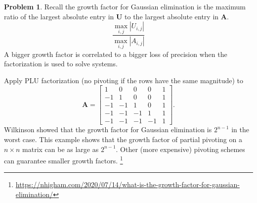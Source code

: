 \documentclass[12pt]{article}
\theoremstyle{definition}
\newtheorem{problem}{Problem}
\renewcommand{\vec}{\mathbf}
\begin{document}
\begin{problem}
    Recall the growth factor for Gaussian elimination is the maximum ratio of the largest absolute entry in $\vec{U}$ to the largest absolute entry in $\vec{A}$.
    \[
        \frac{\max_{i,j} |U_{i,j}|}{\max_{i,j} |A_{i,j}|}
    \]
    A bigger growth factor is correlated to a bigger loss of precision when the factorization is used to solve systems.

    Apply PLU factorization (no pivoting if the rows have the same magnitude) to
    \[
    \vec{A} = 
    \begin{bmatrix}
    	1 & 0 & 0 & 0 & 1 \\
    	-1 & 1 & 0 & 0 & 1 \\
    	-1 & -1 & 1 & 0 & 1 \\
    	-1 & -1 & -1 & 1 & 1 \\
    	-1 & -1 & -1 & -1 & 1
    \end{bmatrix}.
    \]
    Wilkinson showed that the growth factor for Gaussian elimination is $2^{n-1}$ in the worst case.
    This example shows that the growth factor of partial pivoting on a $n\times n$ matrix can be as large as $2^{n-1}$. 
    Other (more expensive) pivoting schemes can guarantee smaller growth factors.
    \footnote{\url{https://nhigham.com/2020/07/14/what-is-the-growth-factor-for-gaussian-elimination/}}

\end{problem}
\end{document}
